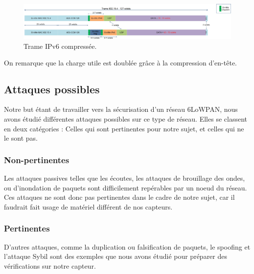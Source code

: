 		\begin{figure}[htp]
			\centering
			\includegraphics[width=17cm]{images/TrameComp.jpg}
			\caption{Trame IPv6 compressée.}
			\label{fig:tramecomp}
		\end{figure}
		On remarque que la charge utile est doublée grâce à la compression d'en-tête.
%	
	\subsection{Attaques possibles}
		Notre but étant de travailler vers la sécurisation d'un réseau 6LoWPAN, nous avons étudié différentes attaques possibles sur ce type de réseau. Elles se classent en deux catégories : Celles qui sont pertinentes pour notre sujet, et celles qui ne le sont pas.\\
		
		\subsubsection{Non-pertinentes}
			Les attaques passives telles que les écoutes, les attaques de brouillage des ondes, ou d'inondation de paquets sont difficilement repérables par un noeud du réseau. Ces attaques ne sont donc pas pertinentes dans le cadre de notre sujet, car il faudrait fait usage de matériel différent de nos capteurs.
		\subsubsection{Pertinentes}
			D'autres attaques, comme la duplication ou falsification de paquets, le spoofing et l'attaque Sybil sont des exemples que nous avons étudié pour préparer des vérifications sur notre capteur.\\
			
